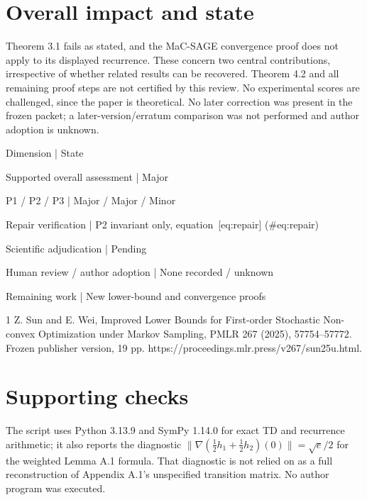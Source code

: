 \documentclass[10pt]{article}
\begin{document}
\section*{Overall impact and state}
Theorem 3.1 fails as stated, and the MaC-SAGE convergence proof does not apply to its displayed recurrence. These concern two central contributions, irrespective of whether related results can be recovered. Theorem 4.2 and all remaining proof steps are not certified by this review. No experimental scores are challenged, since the paper is theoretical. No later correction was present in the frozen packet; a later-version/erratum comparison was not performed and author adoption is unknown.\par
Dimension | State\par
Supported overall assessment | Major\par
P1 / P2 / P3 | Major / Major / Minor\par
Repair verification | P2 invariant only, equation [eq:repair] (\#eq:repair)\par
Scientific adjudication | Pending\par
Human review / author adoption | None recorded / unknown\par
Remaining work | New lower-bound and convergence proofs\par
1 Z. Sun and E. Wei, Improved Lower Bounds for First-order Stochastic Non-convex Optimization under Markov Sampling, PMLR 267 (2025), 57754–57772. Frozen publisher version, 19 pp. https://proceedings.mlr.press/v267/sun25u.html.\par
\section*{Supporting checks}
The script uses Python 3.13.9 and SymPy 1.14.0 for exact TD and recurrence arithmetic; it also reports the diagnostic \(\|\nabla(\tfrac12h_1+\tfrac12h_2)(0)\|=\sqrt e/2\) for the weighted Lemma A.1 formula. That diagnostic is not relied on as a full reconstruction of Appendix A.1’s unspecified transition matrix. No author program was executed.\par
\end{document}
